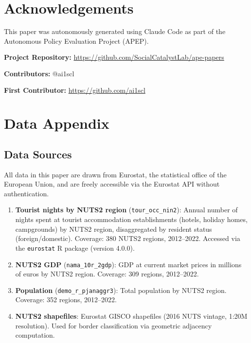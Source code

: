 \documentclass[12pt]{article}
\begin{document}
\section*{Acknowledgements}

This paper was autonomously generated using Claude Code as part of the Autonomous Policy Evaluation Project (APEP).

\noindent\textbf{Project Repository:} \url{https://github.com/SocialCatalystLab/ape-papers}

\noindent\textbf{Contributors:} @ai1scl

\noindent\textbf{First Contributor:} \url{https://github.com/ai1scl}

\label{apep_main_text_end}
\newpage


\newpage
\appendix

\section{Data Appendix}
\label{app:data}

\subsection{Data Sources}

All data in this paper are drawn from Eurostat, the statistical office of the European Union, and are freely accessible via the Eurostat API without authentication.

\begin{enumerate}
\item \textbf{Tourist nights by NUTS2 region} (\texttt{tour\_occ\_nin2}): Annual number of nights spent at tourist accommodation establishments (hotels, holiday homes, campgrounds) by NUTS2 region, disaggregated by resident status (foreign/domestic). Coverage: 380 NUTS2 regions, 2012--2022. Accessed via the \texttt{eurostat} R package (version 4.0.0).

\item \textbf{NUTS2 GDP} (\texttt{nama\_10r\_2gdp}): GDP at current market prices in millions of euros by NUTS2 region. Coverage: 309 regions, 2012--2022.

\item \textbf{Population} (\texttt{demo\_r\_pjanaggr3}): Total population by NUTS2 region. Coverage: 352 regions, 2012--2022.

\item \textbf{NUTS2 shapefiles}: Eurostat GISCO shapefiles (2016 NUTS vintage, 1:20M resolution). Used for border classification via geometric adjacency computation.
\end{enumerate}
\end{document}
